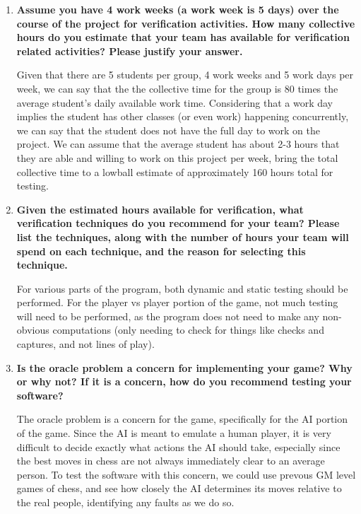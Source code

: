\documentclass[12pt,fleqn]{examtst}
\begin{document}
\begin{enumerate}
\item \textbf{Assume you have 4 work weeks (a work week is 5 days) over the
    course of the project for verification activities.  How many collective
    hours do you estimate that your team has available for verification related
    activities?  Please justify your answer.}

Given that there are 5 students per group, 4 work weeks and 5 work days per week, we can say that the the collective time for the group is 80 times the average student's daily available work time. Considering that a work day implies the student has other classes (or even work) happening concurrently, we can say that the student does not have the full day to work on the project. We can assume that the average student has about 2-3 hours that they are able and willing to work on this project per week, bring the total collective time to a lowball estimate of approximately 160 hours total for testing. 
  
\item \textbf{Given the estimated hours available for verification, what verification
    techniques do you recommend for your team?  Please list the techniques,
    along with the number of hours your team will spend on each technique, and
    the reason for selecting this technique.}

For various parts of the program, both dynamic and static testing should be performed. For the player vs player portion of the game, not much testing will need to be performed, as the program does not need to make any non-obvious computations (only needing to check for things like checks and captures, and not lines of play).
  
\item \textbf{Is the oracle problem a concern for implementing your game?  Why
    or why not?  If it is a concern, how do you recommend testing your software?}

The oracle problem is a concern for the game, specifically for the AI portion of the game. Since the AI is meant to emulate a human player, it is very difficult to decide exactly what actions the AI should take, especially since the best moves in chess are not always immediately clear to an average person. To test the software with this concern, we could use prevous GM level games of chess, and see how closely the AI determines its moves relative to the real people, identifying any faults as we do so.
    
\end{enumerate}
\end{document}
